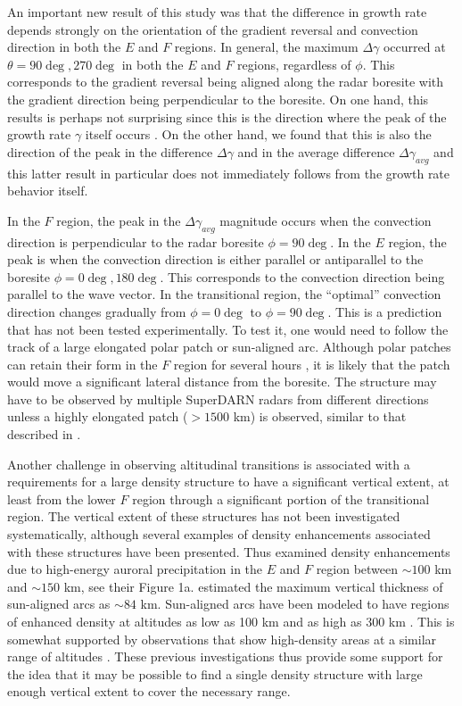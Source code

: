 An important new result of this study was that the difference in growth rate depends strongly on the orientation of the gradient reversal and convection direction in both the \(E\) and \(F\) regions. In general, the maximum \(\Delta\gamma\) occurred at \(\theta=90\deg,270\deg\) in both the \(E\) and \(F\) regions, regardless of \(\phi\).  This corresponds to the gradient reversal being aligned along the radar boresite with the gradient direction being perpendicular to the boresite. On one hand, this results is perhaps not surprising since this is the direction where the peak of the growth rate \(\gamma\) itself occurs \citep{Makarevich2014c}. On the other hand, we found that this is also the direction of the peak in the difference \(\Delta\gamma\) and in the average difference \(\Delta\gamma_{avg}\) and this latter result in particular does not immediately follows from the growth rate behavior itself.

In the \(F\) region, the peak in the \(\Delta\gamma_{avg}\) magnitude occurs when the convection direction is perpendicular to the radar boresite \(\phi=90\deg\). In the \(E\) region, the peak is when the convection direction is either parallel or antiparallel to the boresite \(\phi=0\deg, 180\deg\). This corresponds to the convection direction being parallel to the wave vector. In the transitional region, the ``optimal'' convection direction changes gradually from \(\phi=0\deg\) to \(\phi=90\deg\). This is a prediction that has not been tested experimentally. To test it, one would need to follow the track of a large elongated polar patch or sun-aligned arc.  Although polar patches can retain their form in the \(F\) region for several hours \citep{Hosokawa2014}, it is likely that the patch would move a significant lateral distance from the boresite.  The structure may have to be observed by multiple SuperDARN radars from different directions unless a highly elongated patch (\(>1500\) km) is observed, similar to that described in \citet{Hosokawa2014}. 

Another challenge in observing altitudinal transitions is associated with a requirements for a large density structure to have a significant vertical extent, at least from the lower \(F\) region through a significant portion of the transitional region. The vertical extent of these structures has not been investigated systematically, although several examples of density enhancements associated with these structures have been presented. Thus \citet{Schlatter2013} examined density enhancements due to high-energy auroral precipitation in the \(E\) and \(F\) region between \(\sim100\) km and \(\sim150\) km, see their Figure 1a. \citet{Jayachandran2012} estimated the maximum vertical thickness of sun-aligned arcs as \(\sim84\) km.  Sun-aligned arcs have been modeled to have regions of enhanced density at altitudes as low as 100 km and as high as 300 km \citep{Crain1994}.  This is somewhat  supported by observations that show high-density areas at a similar range of altitudes \citep{Valladares1991}. These previous investigations thus provide some support for the idea that it may be possible to find a single density structure with large enough vertical extent to cover the necessary range.  



